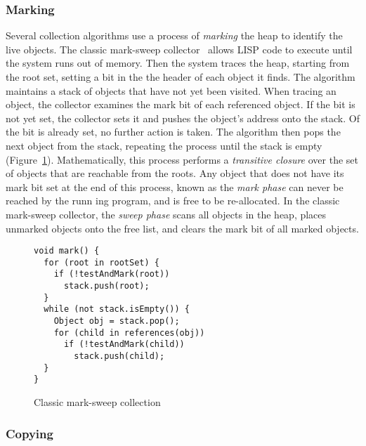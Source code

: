 \subsubsection{Marking}

Several collection algorithms use a process of \emph{marking} the heap to identify the live
objects.  The classic mark-sweep collector~\citep{McCarthy:60} allows LISP code to execute until
the system runs out of memory.  Then the system traces the heap, starting from the root set,
setting a bit in the the header of each object it finds.  The algorithm maintains a stack of
objects that have not yet been visited.  When tracing an object, the collector examines the mark 
bit of each referenced object.  If the bit is not yet set, the collector sets it and pushes the 
object's address onto the stack.  Of the bit is already set, no further action is taken. 
The algorithm then pops the next object from the stack, repeating the process until the stack
is empty (Figure~\ref{fig:intro:mark}).
Mathematically, this process performs a \emph{transitive closure} over the set of objects that
are reachable from the roots.  Any object that does not have its mark bit set at the end of this
process, known as the \emph{mark phase} can never be reached by the runn ing program, and is
free to be re-allocated.  In the classic mark-sweep collector, the \emph{sweep phase} scans all
objects in the heap, places unmarked objects onto the free list, and clears the mark bit of all 
marked objects.

\begin{figure}[h!t]
\begin{lstlisting}
void mark() {
  for (root in rootSet) {
    if (!testAndMark(root)) 
      stack.push(root);
  }
  while (not stack.isEmpty()) {
    Object obj = stack.pop();
    for (child in references(obj))
      if (!testAndMark(child)) 
        stack.push(child);
  }
}
\end{lstlisting}
\caption{Classic mark-sweep collection}
\label{fig:intro:mark}
\end{figure}

\subsubsection{Copying}


